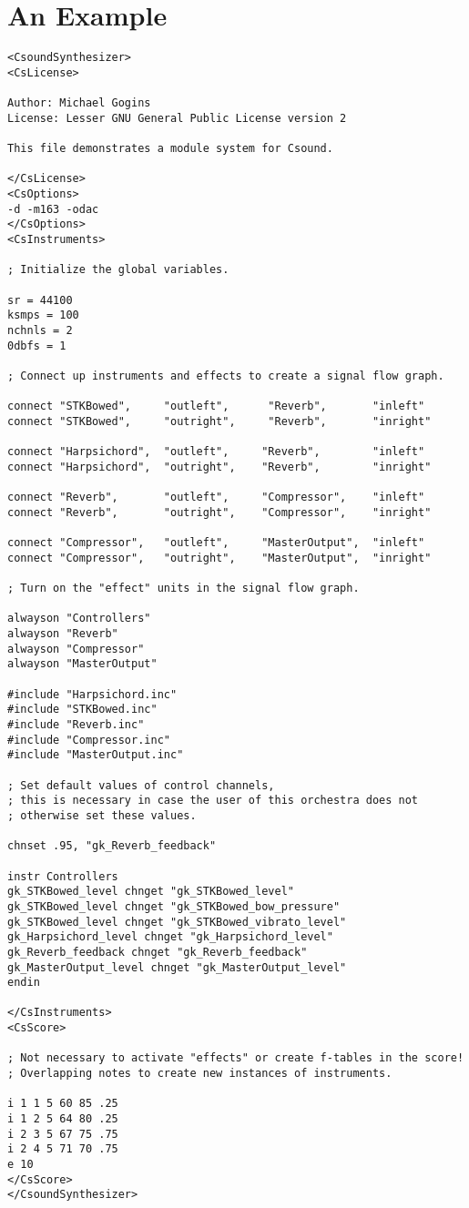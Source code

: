 \documentclass[12pt,letterpaper,onecolumn]{scrartcl}
\begin{document}
\section{An Example}
\label{sec:AnExample}

\begin{lstlisting}
<CsoundSynthesizer>
<CsLicense>

Author: Michael Gogins
License: Lesser GNU General Public License version 2

This file demonstrates a module system for Csound.

</CsLicense>
<CsOptions>
-d -m163 -odac
</CsOptions>
<CsInstruments>

; Initialize the global variables.

sr = 44100
ksmps = 100
nchnls = 2
0dbfs = 1

; Connect up instruments and effects to create a signal flow graph.

connect "STKBowed",     "outleft",      "Reverb",     	"inleft"
connect "STKBowed",     "outright",     "Reverb",     	"inright"

connect "Harpsichord",  "outleft",     "Reverb",     	"inleft"
connect "Harpsichord",  "outright",    "Reverb",     	"inright"

connect "Reverb", 		"outleft",     "Compressor",    "inleft"
connect "Reverb", 		"outright",    "Compressor",    "inright"

connect "Compressor",   "outleft",     "MasterOutput",  "inleft"
connect "Compressor",   "outright",    "MasterOutput",  "inright"

; Turn on the "effect" units in the signal flow graph.

alwayson "Controllers"
alwayson "Reverb"
alwayson "Compressor"
alwayson "MasterOutput"

#include "Harpsichord.inc"
#include "STKBowed.inc"
#include "Reverb.inc"
#include "Compressor.inc"
#include "MasterOutput.inc"

; Set default values of control channels,
; this is necessary in case the user of this orchestra does not
; otherwise set these values.

chnset .95, "gk_Reverb_feedback"

instr Controllers
gk_STKBowed_level chnget "gk_STKBowed_level"
gk_STKBowed_level chnget "gk_STKBowed_bow_pressure"
gk_STKBowed_level chnget "gk_STKBowed_vibrato_level"
gk_Harpsichord_level chnget "gk_Harpsichord_level"
gk_Reverb_feedback chnget "gk_Reverb_feedback"
gk_MasterOutput_level chnget "gk_MasterOutput_level"
endin

</CsInstruments>
<CsScore>

; Not necessary to activate "effects" or create f-tables in the score!
; Overlapping notes to create new instances of instruments.

i 1 1 5 60 85 .25
i 1 2 5 64 80 .25
i 2 3 5 67 75 .75
i 2 4 5 71 70 .75
e 10
</CsScore>
</CsoundSynthesizer>
\end{lstlisting}
\end{document}
